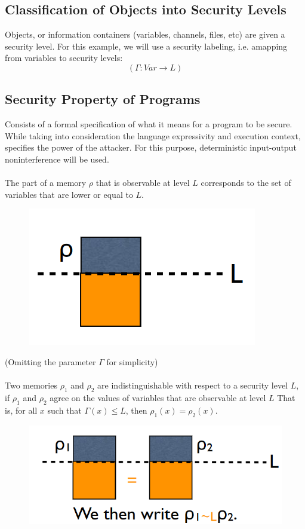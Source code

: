 \documentclass[10pt,a4paper]{report}
\begin{document}
\subsection{Classification of Objects into Security Levels}
Objects, or information containers (variables, channels, files, etc) are given a security level. For this example, we will use a security labeling, i.e. amapping from variables to security levels:
$$
(\Gamma: Var \rightarrow L)
$$
\subsection{Security Property of Programs}
Consists of a formal specification of what it means for a program to be secure. While taking into consideration the language expressivity and execution context, specifies the power of the attacker. For this purpose, deterministic input-output noninterference will be used.\\
\\
The part of a memory $\rho$ that is observable at level $L$ corresponds to the set of variables that are lower or equal to $L$. 
\begin{figure}[H]
\centering
\includegraphics[scale=0.4]{18.png}
\end{figure}
(Omitting the parameter $\Gamma$ for simplicity)\\
\\
Two memories $\rho_1$ and $\rho_2$ are indistinguishable with respect to a security level $L$, if $\rho_1$ and $\rho_2$ agree on the values of variables that are observable at level $L$ That is, for all $x$ such that $\Gamma(x) \leq L$, then $\rho_1(x) = \rho_2(x)$.
\begin{figure}[H]
\centering
\includegraphics[scale=0.4]{19.png}
\end{figure}
\end{document}
